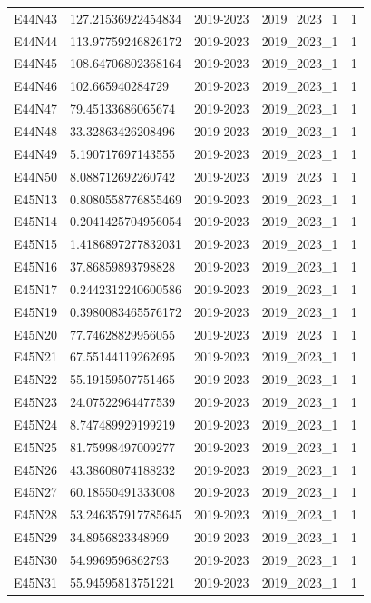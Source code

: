 \begin{landscape}
\begin{longtable}{lllll}
E44N43 & 127.21536922454834 & 2019-2023 & 2019\_2023\_1 & 1 \\
E44N44 & 113.97759246826172 & 2019-2023 & 2019\_2023\_1 & 1 \\
E44N45 & 108.64706802368164 & 2019-2023 & 2019\_2023\_1 & 1 \\
E44N46 & 102.665940284729 & 2019-2023 & 2019\_2023\_1 & 1 \\
E44N47 & 79.45133686065674 & 2019-2023 & 2019\_2023\_1 & 1 \\
E44N48 & 33.32863426208496 & 2019-2023 & 2019\_2023\_1 & 1 \\
E44N49 & 5.190717697143555 & 2019-2023 & 2019\_2023\_1 & 1 \\
E44N50 & 8.088712692260742 & 2019-2023 & 2019\_2023\_1 & 1 \\
E45N13 & 0.8080558776855469 & 2019-2023 & 2019\_2023\_1 & 1 \\
E45N14 & 0.2041425704956054 & 2019-2023 & 2019\_2023\_1 & 1 \\
E45N15 & 1.4186897277832031 & 2019-2023 & 2019\_2023\_1 & 1 \\
E45N16 & 37.86859893798828 & 2019-2023 & 2019\_2023\_1 & 1 \\
E45N17 & 0.2442312240600586 & 2019-2023 & 2019\_2023\_1 & 1 \\
E45N19 & 0.3980083465576172 & 2019-2023 & 2019\_2023\_1 & 1 \\
E45N20 & 77.74628829956055 & 2019-2023 & 2019\_2023\_1 & 1 \\
E45N21 & 67.55144119262695 & 2019-2023 & 2019\_2023\_1 & 1 \\
E45N22 & 55.19159507751465 & 2019-2023 & 2019\_2023\_1 & 1 \\
E45N23 & 24.07522964477539 & 2019-2023 & 2019\_2023\_1 & 1 \\
E45N24 & 8.747489929199219 & 2019-2023 & 2019\_2023\_1 & 1 \\
E45N25 & 81.75998497009277 & 2019-2023 & 2019\_2023\_1 & 1 \\
E45N26 & 43.38608074188232 & 2019-2023 & 2019\_2023\_1 & 1 \\
E45N27 & 60.18550491333008 & 2019-2023 & 2019\_2023\_1 & 1 \\
E45N28 & 53.246357917785645 & 2019-2023 & 2019\_2023\_1 & 1 \\
E45N29 & 34.8956823348999 & 2019-2023 & 2019\_2023\_1 & 1 \\
E45N30 & 54.9969596862793 & 2019-2023 & 2019\_2023\_1 & 1 \\
E45N31 & 55.94595813751221 & 2019-2023 & 2019\_2023\_1 & 1 \\

\end{longtable}
\end{landscape}
